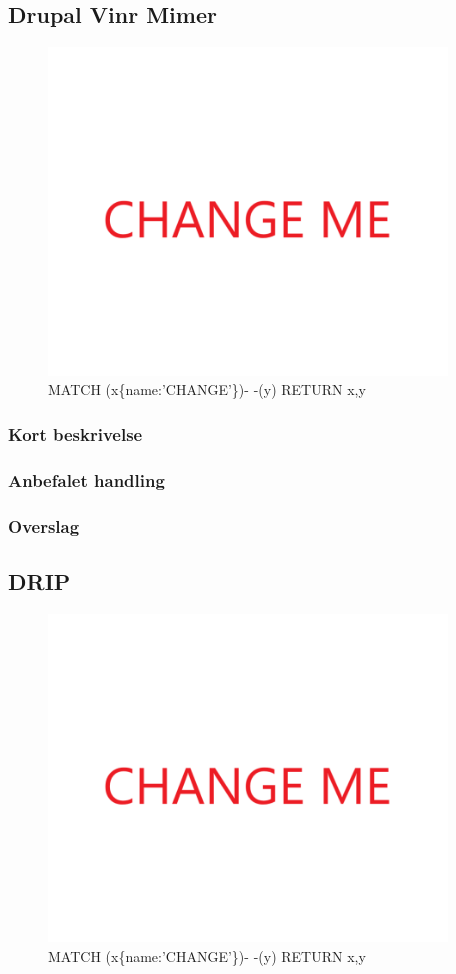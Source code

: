 \documentclass{article}
\begin{document}
\subsection{Drupal Vinr Mimer}
\begin{figure}[h]
\includegraphics[width=300pt]{CHANGE.PNG}
\caption{MATCH (x\{name:'CHANGE'\})- -(y) RETURN x,y}
\end{figure}
\subsubsection{Kort beskrivelse}
\subsubsection{Anbefalet handling}
\subsubsection{Overslag}


\subsection{DRIP}
\begin{figure}[h]
\includegraphics[width=300pt]{CHANGE.PNG}
\caption{MATCH (x\{name:'CHANGE'\})- -(y) RETURN x,y}
\end{figure}
\end{document}
